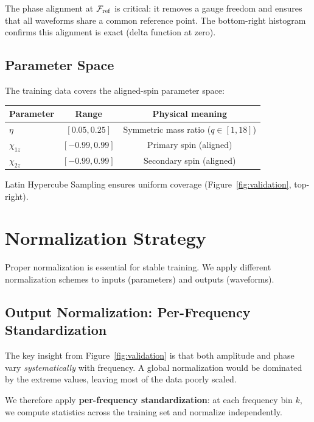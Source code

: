 \documentclass[11pt,a4paper]{article}
\newcommand{\Mf}{\mathcal{F}}
\begin{document}
The phase alignment at $\Mf_{\rm ref}$ is critical: it removes a gauge freedom and ensures that all waveforms share a common reference point. The bottom-right histogram confirms this alignment is exact (delta function at zero).

\subsection{Parameter Space}

The training data covers the aligned-spin parameter space:
\begin{center}
\begin{tabular}{lcc}
\toprule
Parameter & Range & Physical meaning \\
\midrule
$\eta$ & $[0.05, 0.25]$ & Symmetric mass ratio ($q \in [1, 18]$) \\
$\chi_{1z}$ & $[-0.99, 0.99]$ & Primary spin (aligned) \\
$\chi_{2z}$ & $[-0.99, 0.99]$ & Secondary spin (aligned) \\
\bottomrule
\end{tabular}
\end{center}

Latin Hypercube Sampling ensures uniform coverage (Figure~\ref{fig:validation}, top-right).

\section{Normalization Strategy}
\label{sec:normalization}

Proper normalization is essential for stable training. We apply different normalization schemes to inputs (parameters) and outputs (waveforms).

\subsection{Output Normalization: Per-Frequency Standardization}

The key insight from Figure~\ref{fig:validation} is that both amplitude and phase vary \emph{systematically} with frequency. A global normalization would be dominated by the extreme values, leaving most of the data poorly scaled.

We therefore apply \textbf{per-frequency standardization}: at each frequency bin $k$, we compute statistics across the training set and normalize independently.
\end{document}
